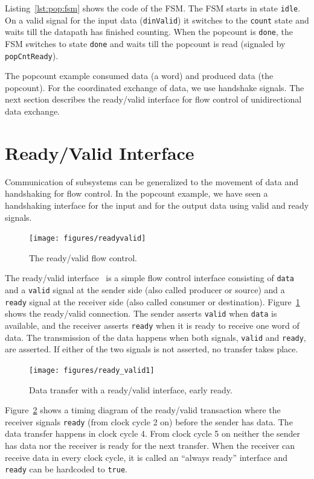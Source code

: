 \documentclass[%
    10pt,
    headinclude, footexclude,
    openright, %
    notitlepage,
    cleardoubleempty,
    headsepline,
    pointlessnumbers,
    bibtotoc, idxtotoc,
    ]{scrbook}
\newcommand{\code}[1]{{\small{\texttt{#1}}}}
\begin{document}
Listing~\ref{lst:pop:fsm} shows the code of the FSM.
The FSM starts in state \code{idle}. On a valid signal for the input data (\code{dinValid}) it
switches to the \code{count} state and waits till the datapath has finished counting.
When the popcount is \code{done}, the FSM switches to state \code{done} and waits till the
popcount is read (signaled by \code{popCntReady}).


The popcount example consumed data (a word) and produced data (the popcount).
For the coordinated exchange of data, we use handshake signals.
The next section describes the ready/valid interface for flow control of
unidirectional data exchange.

\section{Ready/Valid Interface}
\label{sec:ready:valid}

Communication of subsystems can be generalized to the movement
of data and handshaking for flow control. In the popcount example,
we have seen a handshaking interface for the input and for the output data
using valid and ready signals.

\begin{figure}
  \centering
  \texttt{[image: figures/readyvalid]}
  \caption{The ready/valid flow control.}
  \label{fig:readyvalid}
\end{figure}

The ready/valid interface~\cite[p.~480]{dally:vhdl:2016} is a simple flow
control interface consisting of \code{data} and a \code{valid} signal at the
sender side (also called producer or source) and a \code{ready}
signal at the receiver side (also called consumer or destination).
Figure~\ref{fig:readyvalid} shows the ready/valid connection.
The sender asserts \code{valid} when \code{data} is available,
and the receiver asserts \code{ready} when it is ready to receive one word
of data. The transmission of the data happens when both signals, \code{valid}
and \code{ready}, are asserted. If either of the two signals is not asserted,
no transfer takes place.

\begin{figure}
  \centering
  \texttt{[image: figures/ready\_valid1]}
  \caption{Data transfer with a ready/valid interface, early ready.}
  \label{fig:ready_valid1}
\end{figure}

Figure~\ref{fig:ready_valid1} shows a timing diagram of the ready/valid
transaction where the receiver signals \code{ready} (from clock cycle 2 on)
before the sender has data. The data transfer happens in clock cycle 4.
From clock cycle 5 on neither the sender has data nor the receiver is ready
for the next transfer.
When the receiver can receive data in every clock cycle, it is called an
``always ready'' interface and \code{ready} can be hardcoded to \code{true}.
\end{document}
